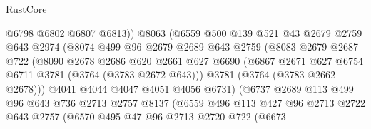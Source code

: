 \begin{lexlean}{RustCore}
\begin{coremodule}
                              @6798
                              @6802
                              @6807
                              @6813))
                          @8063
                          (@6559
                            @500
                            @139
                            @521
                            @43
                            @2679
                            @2759
                            @643
                            @2974
                            (@8074
                              @499
                              @96
                              @2679
                              @2689
                              @643
                              @2759
                              (@8083
                                @2679
                                @2687
                                @722
                                (@8090
                                  @2678
                                  @2686
                                  @620
                                  @2661
                                  @627
                                  @6690
                                  (@6867 @2671 @627 @6754 @6711 @3781 (@3764 (@3783 @2672 @643)))
                                  @3781
                                  (@3764 (@3783 @2662 @2678)))
                                @4041
                                @4044
                                @4047
                                @4051
                                @4056
                                @6731)
                              (@6737
                                @2689
                                @113
                                @499
                                @96
                                @643
                                @736
                                @2713
                                @2757
                                @8137
                                (@6559
                                  @496
                                  @113
                                  @427
                                  @96
                                  @2713
                                  @2722
                                  @643
                                  @2757
                                  (@6570
                                    @495
                                    @47
                                    @96
                                    @2713
                                    @2720
                                    @722
                                    (@6673

\end{coremodule}
\end{lexlean}
